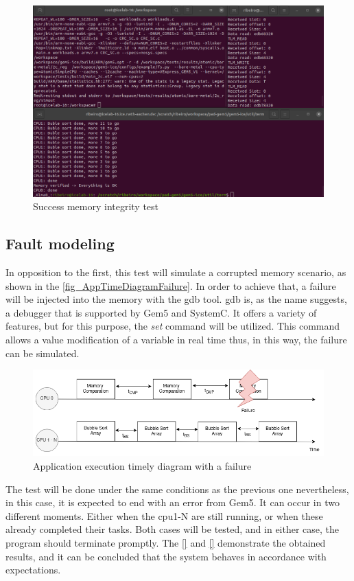 \begin{figure}[H]
	\centering
 	\includegraphics[width=0.8\linewidth]{Images/Success_MemoryIntegrity.png} 
 	\caption{Success memory integrity test}
\end{figure}


\subsection{Fault modeling}

In opposition to the first, this test will simulate a corrupted memory scenario, as shown in the \autoref{fig_AppTimeDiagramFailure}. 
In order to achieve that, a failure will be injected into the memory with the \gls{gdb} tool. \gls*{gdb} is, as the name suggests, a debugger 
that is supported by Gem5 and SystemC. It offers a variety of features, but for this purpose, the \textit{set} command will be utilized. 
This command allows a value modification of a variable in real time thus, in this way, the failure can be simulated.

\begin{figure}[H]
	\centering
 	\includegraphics[width=0.8\linewidth]{Images/AppTimeDiagramFailure.png}
 	\caption{Application execution timely diagram with a failure}
	 \label{fig_AppTimeDiagramFailure}
\end{figure}


The test will be done under the same conditions as the previous one nevertheless, in this case, it is expected to end with an error from Gem5. 
It can occur in two different moments. Either when the \gls*{cpu}1-N are still running, or when these already completed their tasks. Both cases  
will be tested, and in either case, the program should terminate promptly. The \autoref{} and \autoref{} demonstrate the obtained results, and 
it can be concluded that the system behaves in accordance with expectations.

